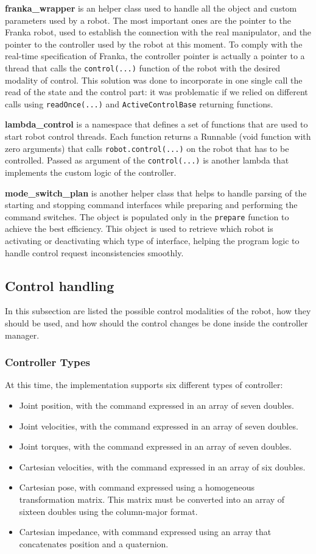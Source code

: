 \documentclass{article}
\begin{document}
\textbf{franka\_wrapper} is an helper class used to handle all the object and custom parameters used by a robot. The most important ones are the pointer to the Franka robot, used to establish the connection with the real manipulator, and the pointer to the controller used by the robot at this moment. To comply with the real-time specification of Franka, the controller pointer is actually a pointer to a thread that calls the \texttt{control(...)} function of the robot with the desired modality of control. This solution was done to incorporate in one single call the read of the state and the control part: it was problematic if we relied on different calls using \texttt{readOnce(...)} and \texttt{ActiveControlBase} returning functions.

\textbf{lambda\_control} is a namespace that defines a set of functions that are used to start robot control threads. Each function returns a Runnable (void function with zero arguments) that calls \texttt{robot.control(...)} on the robot that has to be controlled. Passed as argument of the \texttt{control(...)} is another lambda that implements the custom logic of the controller.

\textbf{mode\_switch\_plan} is another helper class that helps to handle parsing of the starting and stopping command interfaces while preparing and performing the command switches. The object is populated only in the \texttt{prepare} function to achieve the best efficiency. This object is used to retrieve which robot is activating or deactivating which type of interface, helping the program logic to handle control request inconsistencies smoothly.

\subsection{Control handling}
In this subsection are listed the possible control modalities of the robot, how they should be used, and how should the control changes be done inside the controller manager. 
\subsubsection{Controller Types}
At this time, the implementation supports six different types of controller:
\begin{itemize}
    \item Joint position, with the command expressed in an array of seven doubles.
    \item Joint velocities, with the command expressed in an array of seven doubles.
    \item Joint torques, with the command expressed in an array of seven doubles.
    \item Cartesian velocities, with the command expressed in an array of six doubles.
    \item Cartesian pose, with command expressed using a homogeneous transformation matrix. This matrix must be converted into an array of sixteen doubles using the column-major format.
    \item Cartesian impedance, with command expressed using an array that concatenates position and a quaternion.
\end{itemize}
\end{document}
